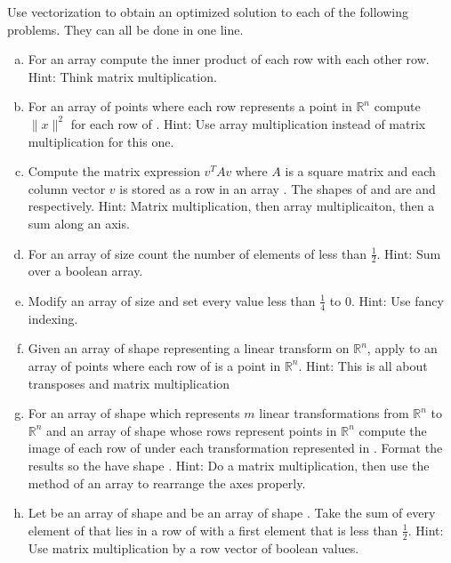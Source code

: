 \begin{problem}
Use vectorization to obtain an optimized solution to each of the following problems.
They can all be done in one line.

\begin{enumerate}[a)]

\item For an array  compute the inner product of each row with each other row.
Hint: Think matrix multiplication.

\item For an array of points  where each row represents a point in $\mathbb{R}^n$ compute $\| x\|^2$ for each row  of .
Hint: Use array multiplication instead of matrix multiplication for this one.

\item Compute the matrix expression $v^T A v$ where $A$ is a square matrix and each column vector $v$ is stored as a row in an array .
The shapes of  and  are  and  respectively.
Hint: Matrix multiplication, then array multiplicaiton, then a sum along an axis.

\item For an array  of size  count the number of elements of  less than $\frac{1}{2}$.
Hint: Sum over a boolean array.

\item Modify an array  of size  and set every value less than $\frac{1}{4}$ to $0$.
Hint: Use fancy indexing.

\item Given an array  of shape  representing a linear transform on $\mathbb{R}^n$, apply  to an array of points  where each row of  is a point in $\mathbb{R}^n$.
Hint: This is all about transposes and matrix multiplication

\item For an array  of shape  which represents $m$ linear transformations from $\mathbb{R}^n$ to $\mathbb{R}^n$ and an array  of shape  whose rows represent points in $\mathbb{R}^n$ compute the image of each row of  under each transformation represented in .
Format the results so the have shape .
Hint: Do a matrix multiplication, then use the  method of an array to rearrange the axes properly.

\item Let  be an array of shape  and  be an array of shape .
Take the sum of every element of  that lies in a row of  with a first element that is less than $\frac{1}{2}$.
Hint: Use matrix multiplication by a row vector of boolean values.


\end{enumerate}
\end{problem}
